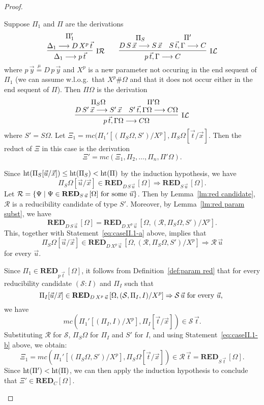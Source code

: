 \documentclass[preprint]{elsarticle}
\def\Rscr{{\mathcal R}}
\def\Sscr{{\mathcal S}}
\newcommand{\Seq}[2]{#1\longrightarrow #2}
\newcommand{\defmu}{\stackrel{\mu}{=}}
\newcommand{\indR}{{\rm I}{\cal R}}
\newcommand{\indL}{{\rm I}{\cal L}}
\newcommand{\measure}[1]{{\rm ht}(#1)}
\def\RED{{\mathbf{RED}}}
\begin{document}
\begin{proof}
\begin{trivlist}
\item[\fbox{$\indR/\indL$}] Suppose $\Pi_1$ and $\Pi$ are the derivations
$$
\infer[\indR] {\Seq {\Delta_1} {p\,\vec t}} { \deduce{\Seq
    {\Delta_1}{D\,X^p\,\vec t}}{\Pi_1'} } \qquad \infer[\indL]
{\Seq{p\,\vec{t}, \Gamma}{C}} {
  \deduce{\Seq{D\,S\,\vec{x}}{S\,\vec{x}}}{\Pi_S} &
  \deduce{\Seq{S\,\vec{t}, \Gamma}{C}}{\Pi'} }
$$
where $p\,\vec y \defmu D\,p\,\vec y$ and $X^p$ is a new parameter not
occuring in the end sequent of $\Pi_1$ (we can assume w.l.o.g.\ that
$X^p \# \Omega$ and that it does not occur either in the end sequent
of $\Pi$).  Then $\Pi\Omega$ is the derivation
$$
\infer[\indL] {\Seq{p\,\vec{t}, \Gamma\Omega}{C\Omega}} {
  \deduce{\Seq{D\,S'\,\vec{x}}{S'\,\vec{x}}}{\Pi_S\Omega} &
  \deduce{\Seq{S'\,\vec{t}, \Gamma\Omega}{C\Omega}}{\Pi'\Omega} }
$$
where $S' = S\Omega$.  
Let $\Xi_1 = mc(\Pi_1'[(\Pi_S\Omega,S')/X^p], \Pi_S\Omega[\vec t/\vec x]$. 
Then the reduct of $\Xi$ in this case is the derivation
$$
\Xi' = mc(\Xi_1,\Pi_2,\ldots,\Pi_n, \Pi'\Omega).
$$


Since $\measure{\Pi_S[\vec u/\vec x]} \leq \measure{\Pi_S} <
\measure{\Pi}$ by the induction hypothesis, we have
\begin{equation}
  \label{eq:caseII.1-a}
  \Pi_S\Omega[\vec u/\vec x] \in \RED_{D\,S\,\vec u}\, [\Omega] \Rightarrow \RED_{S\,\vec u}\, [\Omega].
\end{equation}
Let $\Rscr = \{\Psi \mid \Psi \in \RED_{S\,\vec u}\, [\Omega] \hbox{ for
  some $\vec u$} \}$.  Then by Lemma~\ref{lm:red candidate}, $\Rscr$
is a reducibility candidate of type $S'$.  Moreover, by
Lemma~\ref{lm:red param subst}, we have
$$
\RED_{D\,S\,\vec u}\, [\Omega] = \RED_{D\,X^p\,\vec u}\, [\Omega, (\Rscr,
\Pi_S\Omega,S')/X^p].
$$
This, together with Statement~\ref{eq:caseII.1-a} above, implies that
\begin{equation}
  \label{eq:caseII.1-b}
  \Pi_S\Omega[\vec u/\vec x] \in \RED_{D\,X^p\,\vec u}\, [\Omega, (\Rscr, \Pi_S\Omega,S')/X^p] \Rightarrow \Rscr \,\vec u
\end{equation}
for every $\vec u$.

Since $\Pi_1 \in \RED_{p\,\vec t}\, [\Omega]$, it follows from
Definition~\ref{def:param red} that for every reducibility candidate
$(\Sscr : I)$ and $\Pi_I$ such that
$$
\Pi_I[\vec u/\vec x] \in \RED_{D\,X^p\,\vec u}\, [\Omega, (\Sscr,
\Pi_I,I)/X^p] \Rightarrow \Sscr\,\vec u \hbox{ for every $\vec u$, }
$$
we have
$$
mc(\Pi_1'[(\Pi_I,I)/X^p], \Pi_I[\vec t/\vec x]) \in \Sscr\,\vec t.
$$
Substituting $\Rscr$ for $\Sscr$, $\Pi_S\Omega$ for $\Pi_I$ and $S'$
for $I$, and using Statement~\ref{eq:caseII.1-b} above, we obtain:
$$
\Xi_1 = mc(\Pi_1'[(\Pi_S\Omega,S')/X^p], \Pi_S\Omega[\vec t/\vec x])
\in \Rscr\,\vec t = \RED_{S\,\vec t}\, [\Omega].
$$
Since $\measure{\Pi'} < \measure{\Pi}$, we can then apply the
induction hypothesis to conclude that $\Xi' \in \RED_{C}[\Omega]$.


\end{trivlist}
\end{proof}
\end{document}
